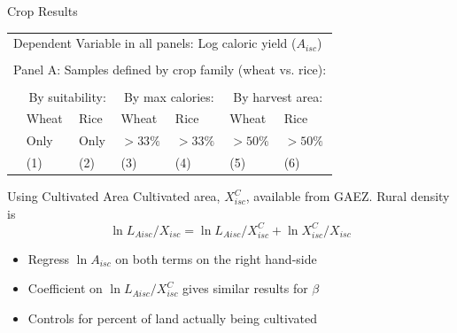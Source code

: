 \documentclass[10pt, xcolor=dvipsnames]{beamer}
\begin{document}
\begin{frame}{Crop Results}

{\footnotesize
\begin{tabularx}{\textwidth}{lXXXXXX}
\midrule
\multicolumn{7}{l}{Dependent Variable in all panels: Log caloric yield ($A_{isc}$)} \\ \\
\multicolumn{7}{l}{Panel A: Samples defined by crop family (wheat vs. rice):} \\ \\
 & \multicolumn{2}{c}{By suitability:} & \multicolumn{2}{c}{By max calories:} & \multicolumn{2}{c}{By harvest area:}\\ \cmidrule(lr){2-3} \cmidrule(lr){4-5} \cmidrule(lr){6-7} 
 & Wheat & Rice & Wheat  & Rice  & Wheat  & Rice \\
 & Only & Only &  $>33\%$ & $>33\%$ & $>50\%$ & $>50\%$   \\
 & (1) & (2) & (3) & (4) & (5) & (6) \\
\midrule

\midrule
\end{tabularx}
}

\end{frame}

\begin{frame}{Using Cultivated Area}\label{cultreg}
Cultivated area, $X^C_{isc}$, available from GAEZ. Rural density is
\begin{equation}
  \ln L_{Aisc}/X_{isc} = \ln L_{Aisc}/X^C_{isc} + \ln X^C_{isc}/X_{isc}
\end{equation}

\begin{itemize}
  \item Regress $\ln A_{isc}$ on both terms on the right hand-side 
  \item Coefficient on $\ln L_{Aisc}/X^C_{isc}$ gives similar results for $\beta$
  \item Controls for percent of land actually being cultivated
\end{itemize}

\hfill \hyperlink{robustness}{}
\end{frame}

\end{document}
